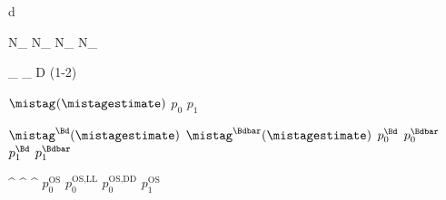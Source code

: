 
\newmathsymbol{\tagdecision}     {d}
\newmathsymbol{\tg}              {\tagdecision}
\newmathsymbol{\mistagestimate}  {\eta}
\newmathsymbol{\deltamistagestimate}{\Delta\mistagestimate}
\newmathsymbol{\mistag}          {\omega}
\newmathsymbol{\deltamistag}     {\Delta\mistag}

\newmathsymbol{\Ntagged}         {N_}
\newmathsymbol{\NRtagged}        {N_}
\newmathsymbol{\NWtagged}        {N_}
\newmathsymbol{\NUtagged}        {N_}

\newmathsymbol{\tageff}          {\eps_}
\newmathsymbol{\efftageff}       {\eps_}
\newmathsymbol{\tagdilution}     {D}
\newmathsymbol{\tagdilutionlg}   {(1-2\mistag)}

\newcommand{\p}[2]                {\ensuremath{p_{#1}^{#2}}\xspace}
\newcommand{\deltap}[2]           {\ensuremath{\Delta p_{#1}^{#2}}\xspace}
\newcommand{\omegaofeta}[1]       {\ensuremath{\mistag^{#1}(\mistagestimate)}\xspace}
\newmathsymbol{\omofeta}          {\omegaofeta{}}
\newmathsymbol{\pzero}            {\p{0}{}}
\newmathsymbol{\deltapzero}       {}
\newmathsymbol{\pone}             {\p{1}{}}
\newmathsymbol{\deltapone}        {}
\newmathsymbol{\avgmistagestimate}{\langle\mistagestimate\rangle}

\newmathsymbol{\omofetaBd}        {\omegaofeta{\Bd}}
\newmathsymbol{\omofetaBdbar}     {\omegaofeta{\Bdbar}}
\newmathsymbol{\pzeroBd}          {\p{0}{\Bd}}
\newmathsymbol{\pzeroBdbar}       {\p{0}{\Bdbar}}
\newmathsymbol{\poneBd}           {\p{1}{\Bd}}
\newmathsymbol{\poneBdbar}        {\p{1}{\Bdbar}}

\newmathsymbol{\tgos}        {\tagdecision^}
\newmathsymbol{\mistagestos} {\mistagestimate^}
\newmathsymbol{\mistagos}    {\mistag^}
\newmathsymbol{\pzeroos}     {\p{0}{\text{OS}}}
\newmathsymbol{\pzeroosll}   {\p{0}{\text{OS,LL}}}
\newmathsymbol{\pzeroosdd}   {\p{0}{\text{OS,DD}}}
\newmathsymbol{\poneos}      {\p{1}{\text{OS}}}
\newmathsymbol{\avgmistagestos}{\langle\mistagestos\rangle}
\newmathsymbol{\avgmistagestosll}{\langle\mistagestosll\rangle}
\newmathsymbol{\avgmistagestosdd}{\langle\mistagestosdd\rangle}


